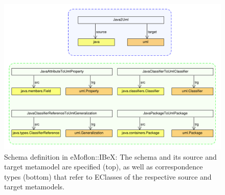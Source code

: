 \begin{figure}
\centering
\includegraphics[width=15.5cm]{figures/Java2Uml_schema_excerpt.pdf}
\caption[Schema definition in eMoflon::IBeX]{Schema definition in eMoflon::IBeX: The schema and its source and target metamodel are specified (top), as well as correspondence types (bottom) that refer to EClasses of the respective source and target metamodels.}
\label{foundationsEmoflonSchema}
\end{figure}

\begin{figure}
\centering

	


\end{figure}


